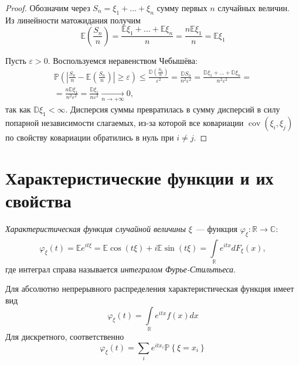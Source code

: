 \begin{proof}
    Обозначим через $S_n = \xi_1 + \ldots + \xi_n$ сумму первых $n$ случайных величин. Из линейности матожидания получим
    \begin{equation*}
        \mathbb{E}\left(\frac{S_{n}}{n}\right)=\frac{\mathbb{E} \xi_{1}+\ldots+\mathbb{E} \xi_{n}}{n}=\frac{n \mathbb{E} \xi_{1}}{n}=\mathbb{E} \xi_{1}
    \end{equation*}
    
    Пусть $\varepsilon > 0.$ Воспользуемся неравенством Чебышёва:
    \begin{multline*}
        \mathbb{P}\left(\left|\frac{S_{n}}{n}-\mathbb{E}\left(\frac{S_{n}}{n}\right)\right| \geqslant \varepsilon\right) \leqslant \frac{\mathbb{D}\left(\frac{S_{n}}{n}\right)}{\varepsilon^{2}}
        = \frac{\mathbb{D} S_{n}}{n^{2} \varepsilon^{2}}
        = \frac{\mathbb{D} \xi_{1}+\ldots+\mathbb{D} \xi_{n}}{n^{2} \varepsilon^{2}}= \\
        = \frac{n \mathbb{D} \xi_{1}}{n^{2} \varepsilon^{2}}
        = \frac{\mathbb{D} \xi_{1}}{n \varepsilon^{2}} \xrightarrow[n \to +\infty]{} 0,
    \end{multline*}
    так как $\mathbb{D}\xi_1 < \infty$. Дисперсия суммы превратилась в сумму дисперсий в силу попарной независимости слагаемых, из-за которой все ковариации $\operatorname{cov}(\xi_i, \xi_j)$ по свойству ковариации обратились в нуль при $i \neq j$.
\end{proof}

\section{Характеристические функции и их свойства}
\begin{defn}
    {\it Характеристическая функция случайной величины} $\xi$~--- функция $\varphi_{\xi}: \mathbb{R} \rightarrow \mathbb{C}$:
    \begin{equation*}
        \varphi_{\xi}(t)
        = \mathbb{E} e^{it \xi}
        = \mathbb{E} \cos (t \xi)+i \mathbb{E} \sin (t \xi) = \int\limits_{\mathbb{R}}^{} e^{i t x} d F_{\xi}(x),
    \end{equation*}
    где интеграл справа называется {\it интегралом Фурье-Стильтьеса}.
    
    Для абсолютно непрерывного распределения характеристическая функция имеет вид
    \begin{equation*}
        \varphi_{\xi}(t)=\int\limits_{\mathbb{R}} e^{i t x} f(x) d x
    \end{equation*}
    Для дискретного, соответственно
    \begin{equation*}
        \varphi_{\xi}(t)=\sum\limits_{i} e^{i t x_{i}} \mathbb{P}\left\{\xi=x_{i}\right\}
    \end{equation*}
\end{defn}

